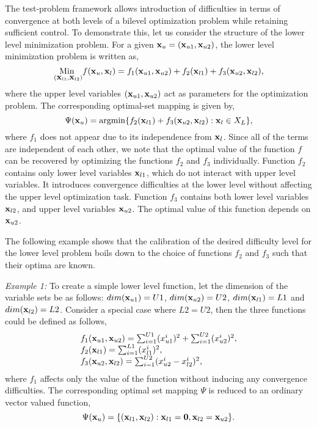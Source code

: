 \documentclass[twoside]{article}
\def\argmin{\mathop{\rm argmin}\limits}
\begin{document}
The test-problem framework allows introduction of difficulties in terms of convergence at both levels of a bilevel optimization problem while retaining sufficient control. To demonstrate this, let us consider the structure of the lower level minimization problem. 
For a given $\mbox{$\mathbf{x}$}_u=(\mbox{$\mathbf{x}$}_{u1},\mbox{$\mathbf{x}$}_{u2})$, the lower level minimization problem is written as,
$$
\underset{(\mbox{$\mathbf{x}$}_{l1},\mbox{$\mathbf{x}$}_{l2})}{\mbox{Min }} f(\mbox{$\mathbf{x}$}_u,\mbox{$\mathbf{x}$}_l)= f_1(\mbox{$\mathbf{x}$}_{u1}, \mbox{$\mathbf{x}$}_{u2}) + f_2(\mbox{$\mathbf{x}$}_{l1}) + f_3(\mbox{$\mathbf{x}$}_{u2},\mbox{$\mathbf{x}$}_{l2}),
$$
where the upper level variables $(\mbox{$\mathbf{x}$}_{u1},\mbox{$\mathbf{x}$}_{u2})$ act as parameters for the optimization problem. The corresponding optimal-set mapping is given by,
$$
\Psi(\boldx_u)=\argmin\{f_2(\boldx_{l1})+f_3(\boldx_{u2},\boldx_{l2}):\boldx_l\in X_L\},
$$
where $f_1$ does not appear due to its independence from $\mbox{$\mathbf{x}$}_l$. Since all of the terms are independent of each other, we note that the optimal value of the function $f$ can be recovered by optimizing the functions $f_2$ and $f_3$ individually. Function $f_2$ contains only lower level variables $\mbox{$\mathbf{x}$}_{l1}$, which do not interact with upper level variables. It introduces convergence difficulties at the lower level without affecting the upper level optimization task. Function $f_3$ contains both lower level variables $\mbox{$\mathbf{x}$}_{l2}$, and upper level variables $\mbox{$\mathbf{x}$}_{u2}$. The optimal value of this function depends on $\mbox{$\mathbf{x}$}_{u2}$.

The following example shows that the calibration of the desired difficulty level for the lower level problem boils down to the choice of functions $f_2$ and $f_3$ such that their optima are known.

\vskip 0.2cm
\textit{Example 1:}\label{ex:simple-lower}
To create a simple lower level function, let the dimension of the variable sets be as follows: $dim(\mbox{$\mathbf{x}$}_{u1}) = U1$, $dim(\mbox{$\mathbf{x}$}_{u2}) = U2$, $dim(\mbox{$\mathbf{x}$}_{l1}) = L1$ and $dim(\mbox{$\mathbf{x}$}_{l2}) = L2$. Consider a special case where $L2 = U2$, then the three functions could be defined as follows,
\begin{equation*}
\begin{array}{l}
f_1(\mbox{$\mathbf{x}$}_{u1}, \mbox{$\mathbf{x}$}_{u2}) = \sum_{i=1}^{U1} (x_{u1}^{i})^2 + \sum_{i=1}^{U2} (x_{u2}^{i})^2,\\
f_2(\mbox{$\mathbf{x}$}_{l1}) =  \sum_{i=1}^{L1} (x_{l1}^{i})^2,\\
f_3(\mbox{$\mathbf{x}$}_{u2},\mbox{$\mathbf{x}$}_{l2}) = \sum_{i=1}^{U2} (x_{u2}^{i} - x_{l2}^{i})^2,\\
\end{array}
\end{equation*}
where $f_1$ affects only the value of the function without inducing any convergence difficulties. The corresponding optimal set mapping $\Psi$ is reduced to an ordinary vector valued function,
$$
\Psi(\mbox{$\mathbf{x}$}_u)=\{(\mbox{$\mathbf{x}$}_{l1},\mbox{$\mathbf{x}$}_{l2}):\mbox{$\mathbf{x}$}_{l1}=\mbox{$\mathbf{0}$}, \mbox{$\mathbf{x}$}_{l2}=\mbox{$\mathbf{x}$}_{u2}\}.
$$
\end{document}
